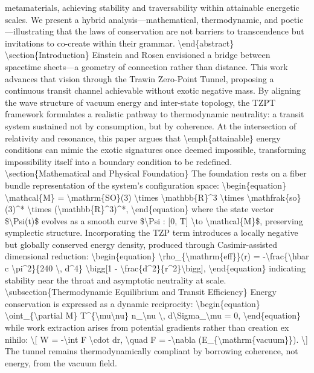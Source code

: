 metamaterials, achieving stability and traversability within attainable energetic scales. We present a hybrid analysis—mathematical, thermodynamic, and poetic—illustrating that the laws of conservation are not barriers to transcendence but invitations to co-create within their grammar. \textbackslash{}end\{abstract\} \textbackslash{}section\{Introduction\} Einstein and Rosen envisioned a bridge between spacetime sheets—a geometry of connection rather than distance. This work advances that vision through the Trawin Zero-Point Tunnel, proposing a continuous transit channel achievable without exotic negative mass. By aligning the wave structure of vacuum energy and inter-state topology, the TZPT framework formulates a realistic pathway to thermodynamic neutrality: a transit system sustained not by consumption, but by coherence. At the intersection of relativity and resonance, this paper argues that \textbackslash{}emph\{attainable\} energy conditions can mimic the exotic signatures once deemed impossible, transforming impossibility itself into a boundary condition to be redefined. \textbackslash{}section\{Mathematical and Physical Foundation\} The foundation rests on a fiber bundle representation of the system’s configuration space: \textbackslash{}begin\{equation\} \textbackslash{}mathcal\{M\} = \textbackslash{}mathrm\{SO\}(3) \textbackslash{}times \textbackslash{}mathbb\{R\}\textasciicircum{}3 \textbackslash{}times \textbackslash{}mathfrak\{so\}(3)\textasciicircum{}* \textbackslash{}times (\textbackslash{}mathbb\{R\}\textasciicircum{}3)\textasciicircum{}*, \textbackslash{}end\{equation\} where the state vector \$\textbackslash{}Psi(t)\$ evolves as a smooth curve \$\textbackslash{}Psi : [0, T] \textbackslash{}to \textbackslash{}mathcal\{M\}\$, preserving symplectic structure. Incorporating the TZP term introduces a locally negative but globally conserved energy density, produced through Casimir-assisted dimensional reduction: \textbackslash{}begin\{equation\} \textbackslash{}rho\_\{\textbackslash{}mathrm\{eff\}\}(r) = -\textbackslash{}frac\{\textbackslash{}hbar c \textbackslash{}pi\textasciicircum{}2\}\{240 \textbackslash{}, d\textasciicircum{}4\} \textbackslash{}bigg[1 - \textbackslash{}frac\{d\textasciicircum{}2\}\{r\textasciicircum{}2\}\textbackslash{}bigg], \textbackslash{}end\{equation\} indicating stability near the throat and asymptotic neutrality at scale. \textbackslash{}subsection\{Thermodynamic Equilibrium and Transit Efficiency\} Energy conservation is expressed as a dynamic reciprocity: \textbackslash{}begin\{equation\} \textbackslash{}oint\_\{\textbackslash{}partial M\} T\textasciicircum{}\{\textbackslash{}mu\textbackslash{}nu\} n\_\textbackslash{}nu \textbackslash{}, d\textbackslash{}Sigma\_\textbackslash{}mu = 0, \textbackslash{}end\{equation\} while work extraction arises from potential gradients rather than creation ex nihilo: \textbackslash{}[ W = -\textbackslash{}int F \textbackslash{}cdot dr, \textbackslash{}quad F = -\textbackslash{}nabla (E\_\{\textbackslash{}mathrm\{vacuum\}\}). \textbackslash{}] The tunnel remains thermodynamically compliant by borrowing coherence, not energy, from the vacuum field.

